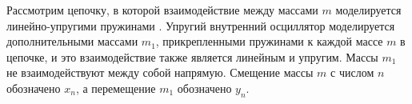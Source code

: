 Рассмотрим цепочку, в которой взаимодействие между массами $ m $ моделируется линейно-упругими пружинами \cite {Huang2010}. Упругий внутренний осциллятор моделируется дополнительными массами $ m_1 $, прикрепленными пружинами к каждой массе $ m $ в цепочке, и это взаимодействие также является линейным и упругим. Массы $ m_1 $ не взаимодействуют между собой напрямую. Смещение массы $ m $ с числом $ n $ обозначено $ x_n $, а перемещение $ m_1 $ обозначено $ y_n $. 

